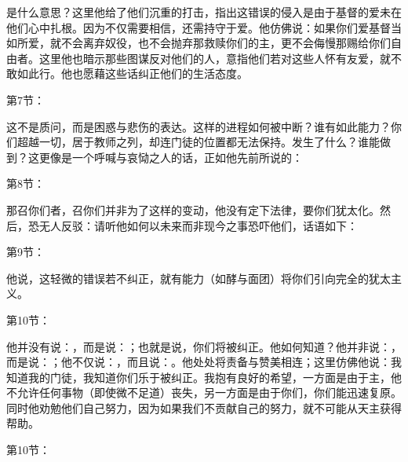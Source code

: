 是什么意思？这里他给了他们沉重的打击，指出这错误的侵入是由于基督的爱未在他们心中扎根。因为不仅需要相信，还需持守于爱。他仿佛说：如果你们爱基督当如所爱，就不会离弃奴役，也不会抛弃那救赎你们的主，更不会侮慢那赐给你们自由者。这里他也暗示那些图谋反对他们的人，意指他们若对这些人怀有友爱，就不敢如此行。他也愿藉这些话纠正他们的生活态度。\par

第7节：\par

这不是质问，而是困惑与悲伤的表达。这样的进程如何被中断？谁有如此能力？你们超越一切，居于教师之列，却连门徒的位置都无法保持。发生了什么？谁能做到？这更像是一个呼喊与哀恸之人的话，正如他先前所说的：\par

第8节：\par

那召你们者，召你们并非为了这样的变动，他没有定下法律，要你们犹太化。然后，恐无人反驳：请听他如何以未来而非现今之事恐吓他们，话语如下：\par

第9节：\par

他说，这轻微的错误若不纠正，就有能力（如酵与面团）将你们引向完全的犹太主义。\par

第10节：\par

他并没有说：，而是说：；也就是说，你们将被纠正。他如何知道？他并非说：，而是说：；他不仅说：，而且说：。他处处将责备与赞美相连；这里仿佛他说：我知道我的门徒，我知道你们乐于被纠正。我抱有良好的希望，一方面是由于主，他不允许任何事物（即使微不足道）丧失，另一方面是由于你们，你们能迅速复原。同时他劝勉他们自己努力，因为如果我们不贡献自己的努力，就不可能从天主获得帮助。\par

第10节：\par

